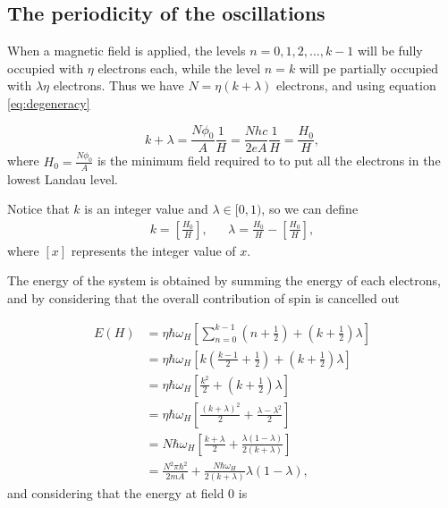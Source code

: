 \documentclass[prd,amsfonts,onecolumn,superscriptaddress,aps,nofootinbib,11pt]{revtex4}
\begin{document}
\subsection{The periodicity of the oscillations}

When a magnetic field is applied, the levels $n = 0,1,2, ... , k-1$ will be fully occupied with $\eta$ electrons each, while the level $n=k$ will pe partially occupied with $\lambda \eta$ electrons. Thus we have $N = \eta(k + \lambda)$ electrons, and using equation \ref{eq:degeneracy}

\begin{equation}\label{eq:filling}
    k + \lambda = \frac{N \phi_0}{A} \frac{1}{H} = \frac{N h c}{2 e A} \frac{1}{H} = \frac{H_0}{H},
\end{equation}
where $H_0 = \frac{N \phi_0}{A}$ is the minimum field required to to put all the electrons in the lowest Landau level.

Notice that $k$ is an integer value and $\lambda \in [0,1)$, so we can define 
\begin{align}\label{eq:coefs}
    k = \left[ \frac{H_0}{H}   \right], && \lambda = \frac{H_0}{H} - \left[ \frac{H_0}{H}   \right],
\end{align}
where $[x]$ represents the integer value of $x$.

The energy of the system is obtained by summing the energy of each electrons, and by considering that the overall contribution of spin is cancelled out

\begin{align}
    E(H) &=  \eta \hbar \omega_H   \left[\sum_{n=0}^{k-1} ( n + \frac{1}{2}  )  + ( k + \frac{1}{2} )\lambda \right]  \\
    &= \eta \hbar \omega_H \left[ k \left(\frac{k-1}{2}  + \frac{1}{2}\right)   +  ( k + \frac{1}{2} )\lambda  \right] \\
    &= \eta \hbar \omega_H \left[   \frac{k^2}{2}  + (k + \frac{1}{2})\lambda       \right] \\
    &= \eta \hbar \omega_H \left[ \frac{(k + \lambda)^2}{2}  + \frac{\lambda - \lambda^2}{2}   \right] \\
    &= N \hbar \omega_H \left[ \frac{k + \lambda}{2}   + \frac{\lambda(1-\lambda)}{2(k+\lambda) }    \right] \\
    &= \frac{N^2 \pi \hbar^2 }{2 m A} + \frac{N \hbar \omega_H}{2(k+\lambda)} \lambda(1 - \lambda), 
\end{align}
and considering that the energy at field 0 is
\end{document}
